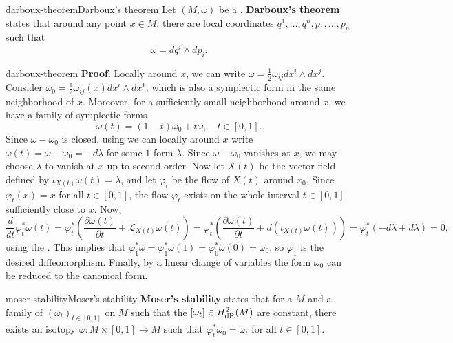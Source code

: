 \begin{topic}{darboux-theorem}{Darboux's theorem}
    Let $(M, \omega)$ be a . \textbf{Darboux's theorem} states that around any point $x \in M$, there are local coordinates $q^1, \ldots, q^n, p_1, \ldots, p_n$ such that
    \[ \omega = dq^i \wedge dp_i . \]
\end{topic}

\begin{example}{darboux-theorem}
    \textbf{Proof}. Locally around $x$, we can write $\omega = \frac{1}{2} \omega_{ij} dx^i \wedge dx^j$. Consider $\omega_0 = \frac{1}{2} \omega_{ij}(x) dx^i \wedge dx^1$, which is also a symplectic form in the same neighborhood of $x$. Moreover, for a sufficiently small neighborhood around $x$, we have a family of symplectic forms
    \[ \omega(t) = (1 - t) \omega_0 + t \omega , \quad t \in [0, 1] . \]
    Since $\omega - \omega_0$ is closed, using  we can locally around $x$ write $\dot{\omega}(t) = \omega - \omega_0 = - d \lambda$ for some $1$-form $\lambda$. Since $\omega - \omega_0$ vanishes at $x$, we may choose $\lambda$ to vanish at $x$ up to second order. Now let $X(t)$ be the vector field defined by $\iota_{X(t)} \omega(t) = \lambda$, and let $\varphi_t$ be the flow of $X(t)$ around $x_0$. Since $\varphi_t(x) = x$ for all $t \in [0, 1]$, the flow $\varphi_t$ exists on the whole interval $t \in [0, 1]$ sufficiently close to $x$. Now,
    \[ \frac{d}{dt} \varphi_t^* \omega(t) = \varphi_t^* \left(\frac{\partial \omega(t)}{\partial t} + \mathcal{L}_{X(t)} \omega(t) \right) = \varphi_t^* \left(\frac{\partial \omega(t)}{\partial t} + d(\iota_{X(t)} \omega(t)) \right) = \varphi_t^* \left( -d \lambda + d \lambda \right) = 0 , \]
    using the . This implies that $\varphi_1^* \omega = \varphi_1^* \omega(1) = \varphi_0^* \omega(0) = \omega_0$, so $\varphi_1$ is the desired diffeomorphism. Finally, by a linear change of variables the form $\omega_0$ can be reduced to the canonical form.
\end{example}

\begin{topic}{moser-stability}{Moser's stability}
    \textbf{Moser's stability} states that for a   $M$ and a family of  $(\omega_t)_{t \in [0, 1]}$ on $M$ such that the  $[\omega_t] \in H^2_{\textup{dR}}(M)$ are constant, there exists an isotopy $\varphi : M \times [0, 1] \to M$ such that $\varphi_t^* \omega_0 = \omega_t$ for all $t \in [0, 1]$.
\end{topic}

